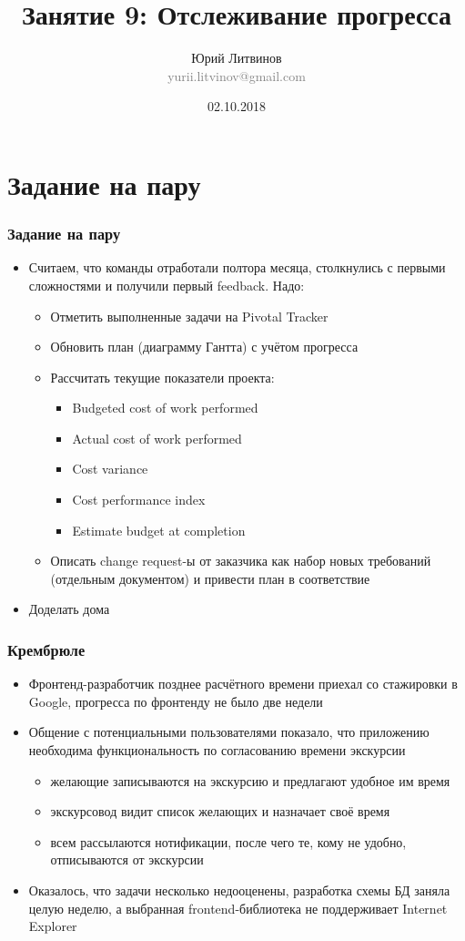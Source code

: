 \documentclass[xetex,mathserif,serif]{beamer}
\title{Занятие 9: Отслеживание прогресса}
\author[Юрий Литвинов]{Юрий Литвинов\\\small{\textcolor{gray}{yurii.litvinov@gmail.com}}}
\date{02.10.2018}
\begin{document}
	\frame{\titlepage}

	\section{Задание на пару}

	\begin{frame}
		\frametitle{Задание на пару}
		\begin{itemize}
			\item Считаем, что команды отработали полтора месяца, столкнулись с первыми сложностями и получили первый feedback. Надо:
			\begin{itemize}
				\item Отметить выполненные задачи на Pivotal Tracker
				\item Обновить план (диаграмму Гантта) с учётом прогресса
				\item Рассчитать текущие показатели проекта:
				\begin{itemize}
					\item Budgeted cost of work performed
					\item Actual cost of work performed
					\item Cost variance
					\item Cost performance index
					\item Estimate budget at completion
				\end{itemize}
				\item Описать change request-ы от заказчика как набор новых требований (отдельным документом) и привести план в соответствие
			\end{itemize}
			\item Доделать дома
		\end{itemize}
	\end{frame}

	\begin{frame}
		\frametitle{Крембрюле}
		\begin{itemize}
			\item Фронтенд-разработчик позднее расчётного времени приехал со стажировки в Google, прогресса по фронтенду не было две недели
			\item Общение с потенциальными пользователями показало, что приложению необходима функциональность по согласованию времени экскурсии
			\begin{itemize}
				\item желающие записываются на экскурсию и предлагают удобное им время
				\item экскурсовод видит список желающих и назначает своё время
				\item всем рассылаются нотификации, после чего те, кому не удобно, отписываются от экскурсии
			\end{itemize}
			\item Оказалось, что задачи несколько недооценены, разработка схемы БД заняла целую неделю, а выбранная frontend-библиотека не поддерживает Internet Explorer
		\end{itemize}
	\end{frame}
\end{document}
